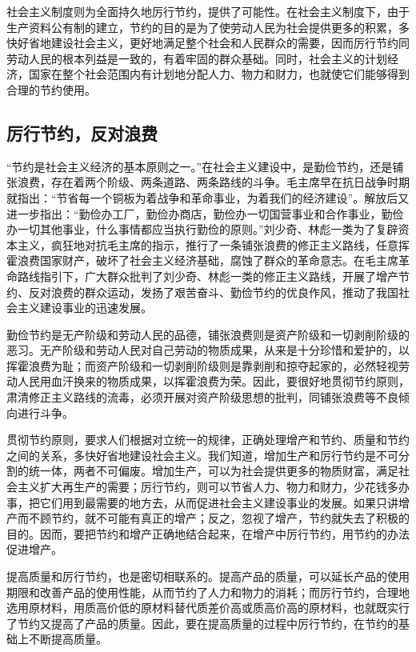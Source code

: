 \documentclass{book}
\begin{document}
社会主义制度则为全面持久地厉行节约，提供了可能性。在社会主义制度下，由于生产资料公有制的建立，节约的目的是为了使劳动人民为社会提供更多的积累，多快好省地建设社会主义，更好地满足整个社会和人民群众的需要，因而厉行节约同劳动人民的根本列益是一致的，有着牢固的群众基础。同时，社会主义的计划经济，国家在整个社会范围内有计划地分配人力、物力和财力，也就使它们能够得到合理的节约使用。

\subsection{厉行节约，反对浪费}

“节约是社会主义经济的基本原则之一。”在社会主义建设中，是勤俭节约，还是铺张浪费，存在着两个阶级、两条道路、两条路线的斗争。毛主席早在抗日战争时期就指出：“节省每一个铜板为着战争和革命事业，为着我们的经济建设”。解放后又进一步指出：“勤俭办工厂，勤俭办商店，勤俭办一切国营事业和合作事业，勤俭办一切其他事业，什么事情都应当执行勤俭的原则。”刘少奇、林彪一类为了复辟资本主义，疯狂地对抗毛主席的指示，推行了一条铺张浪费的修正主义路线，任意挥霍浪费国家财产，破坏了社会主义经济基础，腐蚀了群众的革命意志。在毛主席革命路线指引下，广大群众批判了刘少奇、林彪一类的修正主义路线，开展了增产节约、反对浪费的群众运动，发扬了艰苦奋斗、勤俭节约的优良作风，推动了我国社会主义建设事业的迅速发展。

勤俭节约是无产阶级和劳动人民的品德，铺张浪费则是资产阶级和一切剥削阶级的恶习。无产阶级和劳动人民对自己劳动的物质成果，从来是十分珍惜和爱护的，以挥霍浪费为耻；而资产阶级和一切剥削阶级则是靠剥削和掠夺起家的，必然轻视劳动人民用血汗换来的物质成果，以挥霍浪费为荣。因此，要很好地贯彻节约原则，肃清修正主义路线的流毒，必须开展对资产阶级思想的批判，同铺张浪费等不良倾向进行斗争。

贯彻节约原则，要求人们根据对立统一的规律，正确处理增产和节约、质量和节约之间的关系，多快好省地建设社会主义。我们知道，增加生产和厉行节约是不可分割的统一体，两者不可偏废。增加生产，可以为社会提供更多的物质财富，满足社会主义扩大再生产的需要；厉行节约，则可以节省人力、物力和财力，少花钱多办事，把它们用到最需要的地方去，从而促进社会主义建设事业的发展。如果只讲增产而不顾节约，就不可能有真正的增产；反之，忽视了增产，节约就失去了积极的目的。因而，要把节约和增产正确地结合起来，在增产中厉行节约，用节约的办法促进增产。

提高质量和厉行节约，也是密切相联系的。提高产品的质量，可以延长产品的使用期限和改善产品的使用性能，从而节约了人力和物力的消耗；而厉行节约，合理地选用原材料，用质高价低的原材料替代质差价高或质高价高的原材料，也就既实行了节约又提高了产品的质量。因此，要在提高质量的过程中厉行节约，在节约的基础上不断提高质量。
\end{document}
